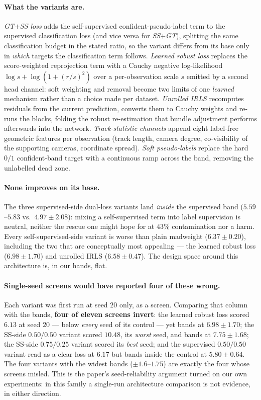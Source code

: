 \documentclass{article}
\newcommand{\mad}{madweight}
\begin{document}
\paragraph{What the variants are.} \emph{GT$+$SS loss} adds the self-supervised
confident-pseudo-label term to the supervised classification loss (and vice versa for
\emph{SS$+$GT}), splitting the same classification budget in the stated ratio, so the
variant differs from its base only in \emph{which} targets the classification term
follows. \emph{Learned robust loss} replaces the score-weighted reprojection term with a
Cauchy negative log-likelihood $\log s + \log(1+(r/s)^2)$ over a per-observation scale
$s$ emitted by a second head channel: soft weighting and removal become two limits of
one \emph{learned} mechanism rather than a choice made per dataset. \emph{Unrolled IRLS}
recomputes residuals from the current prediction, converts them to Cauchy weights and
re-runs the blocks, folding the robust re-estimation that bundle adjustment performs
afterwards into the network. \emph{Track-statistic channels} append eight label-free
geometric features per observation (track length, camera degree, co-visibility of the
supporting cameras, coordinate spread). \emph{Soft pseudo-labels} replace the hard
$0/1$ confident-band target with a continuous ramp across the band, removing the
unlabelled dead zone.

\paragraph{None improves on its base.} The three supervised-side dual-loss variants land
\emph{inside} the supervised band ($5.59$--$5.83$ vs.\ $4.97\pm2.08$): mixing a
self-supervised term into label supervision is neutral, neither the rescue one might
hope for at $43\%$ contamination nor a harm. Every self-supervised-side variant is worse
than plain \mad{} ($6.37\pm0.20$), including the two that are conceptually most
appealing --- the learned robust loss ($6.98\pm1.70$) and unrolled IRLS
($6.58\pm0.47$). The design space around this architecture is, in our hands, flat.

\paragraph{Single-seed screens would have reported four of these wrong.} Each variant
was first run at seed $20$ only, as a screen. Comparing that column with the bands,
\textbf{four of eleven screens invert}: the learned robust loss scored $6.13$ at seed
$20$ --- below \emph{every} seed of its control --- yet bands at $6.98\pm1.70$; the
SS-side $0.50/0.50$ variant scored $10.48$, its \emph{worst} seed, and bands at
$7.75\pm1.68$; the SS-side $0.75/0.25$ variant scored its \emph{best} seed; and the
supervised $0.50/0.50$ variant read as a clear loss at $6.17$ but bands inside the
control at $5.80\pm0.64$. The four variants with the widest bands ($\pm1.6$--$1.75$) are
exactly the four whose screens misled. This is the paper's seed-reliability argument
turned on our own experiments: in this family a single-run architecture comparison is
not evidence, in either direction.
\end{document}
